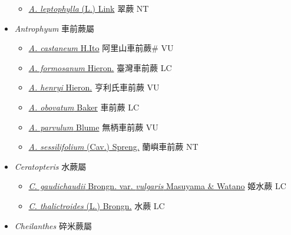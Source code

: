 \begin{itemize}
  \begin{itemize}
        \item[] \href{http://www.theplantlist.org/tpl1.1/search?q=Anogramma+leptophylla}{\textit{A. leptophylla} (L.) Link}   翠蕨 NT
  \end{itemize}
 \item[] \textit{Antrophyum} 車前蕨屬
                    
  \begin{itemize}
        \item[] \href{http://www.theplantlist.org/tpl1.1/search?q=Antrophyum+castaneum}{\textit{A. castaneum} H.Ito}   阿里山車前蕨\# VU
        \item[] \href{http://www.theplantlist.org/tpl1.1/search?q=Antrophyum+formosanum}{\textit{A. formosanum} Hieron.}   臺灣車前蕨 LC
        \item[] \href{http://www.theplantlist.org/tpl1.1/search?q=Antrophyum+henryi}{\textit{A. henryi} Hieron.}   亨利氏車前蕨 VU
        \item[] \href{http://www.theplantlist.org/tpl1.1/search?q=Antrophyum+obovatum}{\textit{A. obovatum} Baker}   車前蕨 LC
        \item[] \href{http://www.theplantlist.org/tpl1.1/search?q=Antrophyum+parvulum}{\textit{A. parvulum} Blume}   無柄車前蕨 VU
        \item[] \href{http://www.theplantlist.org/tpl1.1/search?q=Antrophyum+sessilifolium}{\textit{A. sessilifolium} (Cav.) Spreng.}   蘭嶼車前蕨 NT
  \end{itemize}
 \item[] \textit{Ceratopteris} 水蕨屬
                    
  \begin{itemize}
        \item[] \href{http://www.theplantlist.org/tpl1.1/search?q=Ceratopteris+gaudichaudii+var.+vulgaris}{\textit{C. gaudichaudii} Brongn. var. \textit{vulgaris} Masuyama \& Watano}   姬水蕨 LC
        \item[] \href{http://www.theplantlist.org/tpl1.1/search?q=Ceratopteris+thalictroides}{\textit{C. thalictroides} (L.) Brongn.}   水蕨 LC
  \end{itemize}
 \item[] \textit{Cheilanthes} 碎米蕨屬
                    

\end{itemize}

